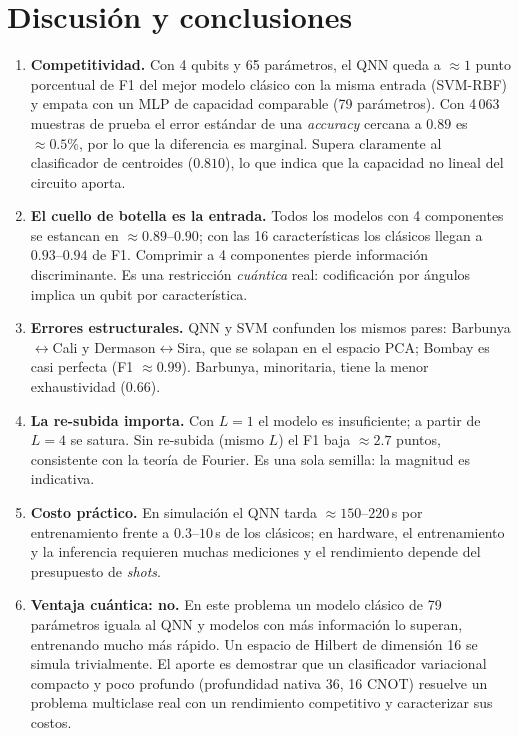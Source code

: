 \documentclass[11pt,letterpaper]{article}
\begin{document}
\section{Discusión y conclusiones}
\begin{enumerate}[leftmargin=*]
\item \textbf{Competitividad.} Con 4 qubits y 65 parámetros, el QNN queda a $\approx1$ punto
porcentual de F1 del mejor modelo clásico con la misma entrada (SVM-RBF) y empata con un MLP de
capacidad comparable (79 parámetros). Con 4\,063 muestras de prueba el error estándar de una
\emph{accuracy} cercana a $0.89$ es $\approx0.5\%$, por lo que la diferencia es marginal. Supera
claramente al clasificador de centroides ($0.810$), lo que indica que la capacidad no lineal del
circuito aporta.
\item \textbf{El cuello de botella es la entrada.} Todos los modelos con 4 componentes se estancan en
$\approx0.89$--$0.90$; con las 16 características los clásicos llegan a $0.93$--$0.94$ de F1. Comprimir
a 4 componentes pierde información discriminante. Es una restricción \emph{cuántica} real: codificación
por ángulos implica un qubit por característica.
\item \textbf{Errores estructurales.} QNN y SVM confunden los mismos pares: Barbunya$\leftrightarrow$Cali
y Dermason$\leftrightarrow$Sira, que se solapan en el espacio PCA; Bombay es casi perfecta
(F1 $\approx0.99$). Barbunya, minoritaria, tiene la menor exhaustividad ($0.66$).
\item \textbf{La re-subida importa.} Con $L=1$ el modelo es insuficiente; a partir de $L=4$ se
satura. Sin re-subida (mismo $L$) el F1 baja $\approx2.7$ puntos, consistente con la teoría de
Fourier. Es una sola semilla: la magnitud es indicativa.
\item \textbf{Costo práctico.} En simulación el QNN tarda $\approx150$--$220$\,s por entrenamiento
frente a $0.3$--$10$\,s de los clásicos; en hardware, el entrenamiento y la inferencia requieren
muchas mediciones y el rendimiento depende del presupuesto de \emph{shots}.
\item \textbf{Ventaja cuántica: no.} En este problema un modelo clásico de 79 parámetros iguala al QNN
y modelos con más información lo superan, entrenando mucho más rápido. Un espacio de Hilbert de
dimensión 16 se simula trivialmente. El aporte es demostrar que un clasificador variacional compacto
y poco profundo (profundidad nativa 36, 16 CNOT) resuelve un problema multiclase real con un
rendimiento competitivo y caracterizar sus costos.
\end{enumerate}
\end{document}
